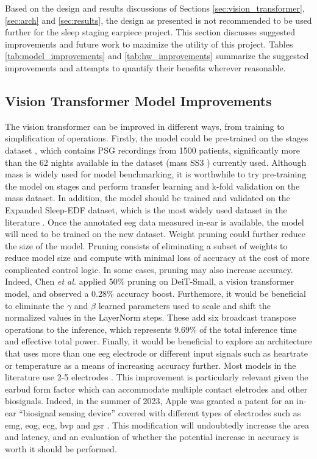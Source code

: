 Based on the design and results discussions of Sections \ref{sec:vision_transformer}, \ref{sec:arch} and \ref{sec:results}, the design as presented is not recommended to be used
further for the sleep staging earpiece project. This section discusses suggested improvements and future work to maximize the utility of this project. Tables \ref{tab:model_improvements}
and \ref{tab:hw_improvements} summarize the suggested improvements and attempts to quantify their benefits wherever reasonable.

\subsection{Vision Transformer Model Improvements}
The vision transformer can be improved in different ways, from training to simplification of operations. Firstly, the model could be pre-trained on the \ac{stages} dataset
\cite{zhang2018national}, which contains PSG recordings from 1500 patients, significantly more than the 62 nights available in the dataset (\ac{mass} SS3 \cite{SP3/9MYUCS_2022})
currently used. Although \ac{mass} is widely used for model benchmarking, it is worthwhile to try pre-training the model on \ac{stages} and perform transfer learning and k-fold
validation on the \ac{mass} dataset. In addition, the model should be trained and validated on the Expanded Sleep-EDF dataset, which is the most widely used dataset in the literature
\cite{physiobank2000physionet}. Once the annotated \ac{eeg} data measured in-ear is available, the model will need to be trained on the new dataset. Weight pruning could further
reduce the size of the model. Pruning consists of eliminating a subset of weights to reduce model size and compute with minimal loss of accuracy at the cost of more complicated
control logic. In some cases, pruning may also increase accuracy. Indeed, Chen \textit{et al.} applied 50\% pruning on DeiT-Small, a vision transformer model, and observed a 0.28\%
accuracy boost. Furthemore, it would be beneficial to eliminate the $\gamma$ and $\beta$ learned parameters used to scale and shift the normalized values in the LayerNorm steps. These
add six broadcast transpose operations to the inference, which represents 9.69\% of the total inference time and effective total power. Finally, it would be beneficial to explore
an architecture that uses more than one \ac{eeg} electrode or different input signals such as heartrate or temperature as a means of increasing accuracy further. Most models in the
literature use 2-5 electrodes \cite{zhuang2022intelligent, phan2021xsleepnet}. This improvement is particularly relevant given the earbud form factor which can accommodate multiple
contact eletrodes and other biosignals. Indeed, in the summer of 2023, Apple was granted a patent for an in-ear ``biosignal sensing device'' covered with different types of electrodes
such as \ac{emg}, \ac{eog}, \ac{ecg}, \ac{bvp} and \ac{gsr} \cite{apple2023biosignal}. This modification will undoubtedly increase the area and latency, and an evaluation of whether the
potential increase in accuracy is worth it should be performed.

